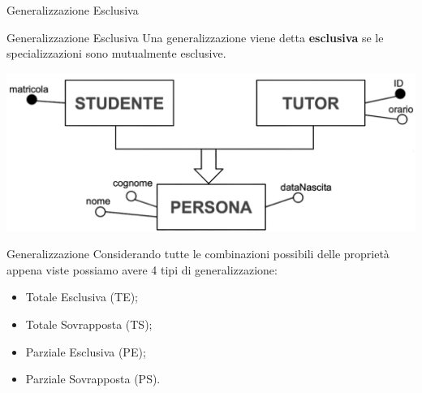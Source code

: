 \begin{frame}{Generalizzazione Esclusiva}
\begin{minipage}{.9\textwidth}
    \begin{block}{Generalizzazione Esclusiva}
        Una generalizzazione viene detta \textbf{esclusiva} se le specializzazioni sono mutualmente esclusive.
    \end{block}
\end{minipage}
\begin{center}
    \includegraphics[width=.8\textwidth]{sections/er-model/img/generalization5.png}
\end{center}
\end{frame}
%
\begin{frame}{Generalizzazione}
Considerando tutte le combinazioni possibili delle propriet\`a appena viste possiamo avere 4 tipi di generalizzazione:
\begin{itemize}
    \item Totale Esclusiva (TE);
    \item Totale Sovrapposta (TS);
    \item Parziale Esclusiva (PE);
    \item Parziale Sovrapposta (PS).
\end{itemize}
\end{frame}